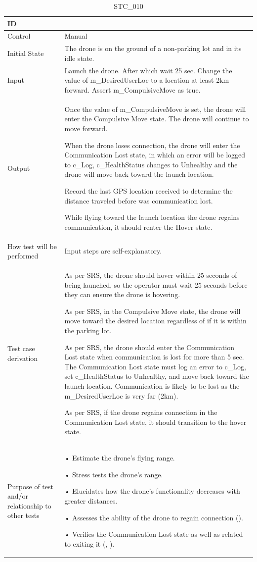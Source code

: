 \documentclass[12pt, titlepage]{article}
\begin{document}
\begin{table}[!h]
\begin{center}
\caption {STC\_010}
\label{tab:STC_010}
\begin{tabular}{ | m{3.2cm} | m{12.2cm} | } 
\hline
ID & \nameref{tab:STC_010} \\ 
\hline
Control & Manual \\ 
\hline
Initial State & The drone is on the ground of a non-parking lot and in its idle state. \\ 
\hline
Input & Launch the drone. After which wait 25 sec.   Change the value of m_DesiredUserLoc to a location at least 2km forward. Assert m_CompulsiveMove as true. \\ 
\hline
Output & Once the value of m_CompulsiveMove is set, the drone will enter the Compulsive Move state. The drone will continue to move forward. 

When the drone loses connection, the drone will enter the Communication Lost state, in which an error will be logged to c_Log, c_HealthStatus changes to Unhealthy and the drone will move back toward the launch location. 

Record the last GPS location received to determine the distance traveled before was communication lost. 

While flying toward the launch location the drone regains communication, it should renter the Hover state. \\ 
\hline
How test will be performed & Input steps are self-explanatory. \\ 
\hline
Test case derivation & As per SRS, the drone should hover within 25 seconds of being launched, so the operator must wait 25 seconds before they can ensure the drone is hovering. 

As per SRS, in the Compulsive Move state, the drone will move toward the desired location regardless of if it is within the parking lot.

As per SRS, the drone should enter the Communication Lost state when communication is lost for more than 5 sec. The Communication Lost state must log an error to c_Log, set c_HealthStatus to Unhealthy, and move back toward the launch location. Communication is likely to be lost as the m_DesiredUserLoc is very far (2km).

As per SRS, if the drone regains connection in the Communication Lost state, it should transition to the hover state.
 \\ 
\hline
Purpose of test and/or relationship to other tests & • Estimate the drone's flying range.

• Stress tests the drone's range.

• Elucidates how the drone's functionality decreases with greater distances. 

• Assesses the ability of the drone to regain connection (\nameref{SR_007}).

• Verifies the Communication Lost state as well as related to exiting it (\nameref{STA_010}, \nameref{TRANS_010}). 

\\ 
\hline
\end{tabular}
\end{center}
\end{table}
\end{document}
